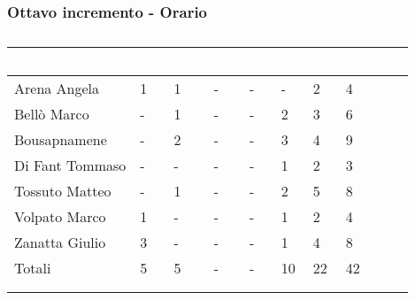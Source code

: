             \subsubsection{Ottavo incremento - Orario} {
                \setlength{\freewidth}{\dimexpr\textwidth-30\tabcolsep}
            \renewcommand{\arraystretch}{1.0}
            \setlength{\aboverulesep}{0pt}
            \setlength{\belowrulesep}{0pt}
            \begin{longtable}{C{.3\freewidth} C{.1\freewidth} C{.1\freewidth} C{.1\freewidth} C{.1\freewidth} C{.1\freewidth} C{.1\freewidth} C{.1\freewidth} C{.1\freewidth} C{.3\freewidth}}
            \toprule
            \textcolor{white}{\textbf{Componente}}&
            \textcolor{white}{\textbf{Re}}&
            \textcolor{white}{\textbf{Am}}&
            \textcolor{white}{\textbf{An}}&
            \textcolor{white}{\textbf{Pt}}&
            \textcolor{white}{\textbf{Pr}}&
            \textcolor{white}{\textbf{Ve}}&
            \textcolor{white}{\textbf{Ore}} \\
            \toprule
            \endhead
    
            Arena Angela & 1 & 1 & - & - & - & 2 & 4\\      
            Bellò Marco & - & 1 & - & - & 2 & 3 & 6\\      
            Bousapnamene & - & 2 & - & - & 3 & 4 & 9\\      
            Di Fant Tommaso & - & - & - & - & 1 & 2 & 3\\      
            Tossuto Matteo & - & 1 & - & - & 2 & 5  & 8 \\      
            Volpato Marco & 1 & - & - & - & 1 & 2 &  4 \\      
            Zanatta Giulio & 3 & - & - & - & 1 & 4 & 8 \\      
            Totali & 5 & 5 & - & - & 10 & 22 & 42 \\
            \bottomrule
            \\
            \caption{}

            \end{longtable}
            }
            
